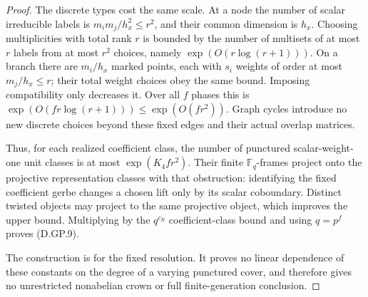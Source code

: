 \begin{proof}
The discrete types cost the same scale.
At a node the number of scalar irreducible
labels is \(m_i m_j/h_x^2\leq r^2\), and
their common dimension is \(h_x\).
Choosing multiplicities with total rank
\(r\) is bounded by the number of
multisets of at most \(r\) labels from
at most \(r^2\) choices, namely
\(\exp(O(r\log(r+1)))\). On a branch
there are \(m_i/h_x\) marked points,
each with \(s_i\) weights of order
at most \(m_j/h_x\leq r\); their total
weight choices obey the same bound.
Imposing compatibility only decreases
it. Over all \(f\) phases this is
\(\exp(O(fr\log(r+1)))\leq\exp(O(fr^2))\).
Graph cycles introduce no new discrete
choices beyond these fixed edges and
their actual overlap matrices.

Thus, for each realized coefficient class,
the number of punctured scalar-weight-one
unit classes is at most \(\exp(K_4fr^2)\).
Their finite \(\mathbb F_q\)-frames project
onto the projective representation classes
with that obstruction: identifying the
fixed coefficient gerbe changes a chosen
lift only by its scalar coboundary. Distinct
twisted objects may project to the same
projective object, which improves the
upper bound. Multiplying by the
\(q^{c_R}\) coefficient-class bound and
using \(q=p^f\) proves (D.GP.9).

The construction is for the fixed resolution.
It proves no linear dependence of these
constants on the degree of a varying
punctured cover, and therefore gives no
unrestricted nonabelian crown or full
finite-generation conclusion.
\end{proof}

